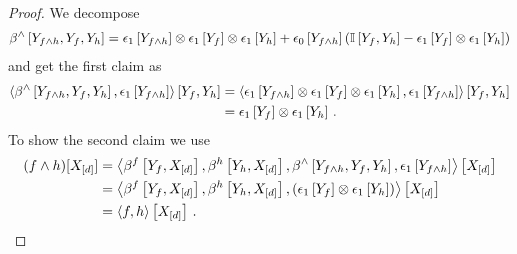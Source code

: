 \begin{proof}
    We decompose
    \begin{align*}
        \beta^{\land}\left[Y_{f\land h},Y_{f},Y_{h}\right]
        = \epsilon_1\left[Y_{f\land h}\right] \otimes \epsilon_1\left[Y_{f}\right] \otimes \epsilon_1\left[Y_{h}\right]
        + \epsilon_0\left[Y_{f\land h}\right] \left( \mathbb{I}\left[Y_{f},Y_{h}\right] -  \epsilon_1\left[Y_{f}\right] \otimes \epsilon_1\left[Y_{h}\right] \right)
    \end{align*}
    and get the first claim as
    \begin{align*}
        \left\langle 
            \beta^{\land}\left[Y_{f\land h},Y_{f},Y_{h}\right],\epsilon_1\left[Y_{f\land h}\right]
        \right\rangle \left[ Y_{f},Y_{h} \right]
        & = \left\langle 
            \epsilon_1\left[Y_{f\land h}\right] \otimes \epsilon_1\left[Y_{f}\right] \otimes \epsilon_1\left[Y_{h}\right],\epsilon_1\left[Y_{f\land h}\right]
        \right\rangle \left[ Y_{f},Y_{h} \right] \\
        & = \epsilon_1\left[Y_{f}\right] \otimes \epsilon_1\left[Y_{h}\right] \, .
    \end{align*}
    To show the second claim we use
    \begin{align*}
    (f\land h)[X_{[d]}]
        &= \left\langle 
            \beta^{f}\left[Y_{f},X_{[d]}\right],
            \beta^{h}\left[Y_{h},X_{[d]}\right],
            \beta^{\land}\left[Y_{f\land h},Y_{f},Y_{h}\right],
            \epsilon_1\left[Y_{f\land h}\right]
        \right\rangle \left[ X_{[d]} \right] \\
        &  = \left\langle 
            \beta^{f}\left[Y_{f},X_{[d]}\right],
            \beta^{h}\left[Y_{h},X_{[d]}\right],
            (\epsilon_1\left[Y_{f}\right]\otimes \epsilon_1\left[Y_{h}\right])
        \right\rangle \left[ X_{[d]} \right] \\
        &= \left\langle f,h\right\rangle \left[ X_{[d]} \right] \, .
    \end{align*}
\end{proof}

